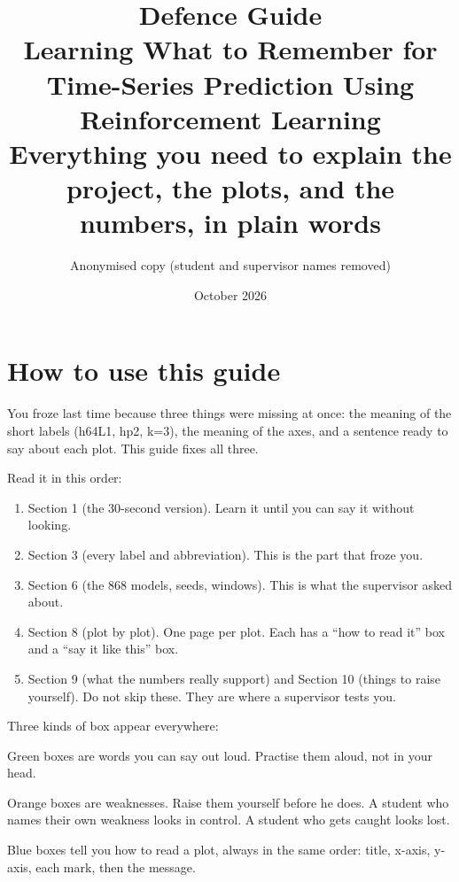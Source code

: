 \documentclass[11pt,a4paper]{article}
\title{\vspace{-1.5cm}\textbf{Defence Guide}\\[4pt]
\large Learning What to Remember for Time-Series Prediction Using Reinforcement Learning\\[2pt]
\normalsize Everything you need to explain the project, the plots, and the numbers, in plain words}
\author{Anonymised copy \quad (student and supervisor names removed)}
\date{October 2026}
\begin{document}
\maketitle
\vspace{-0.6cm}

\tableofcontents
\newpage

\section*{How to use this guide}

You froze last time because three things were missing at once: the meaning of the
short labels (h64L1, hp2, k=3), the meaning of the axes, and a sentence ready to say
about each plot. This guide fixes all three.

Read it in this order:
\begin{enumerate}
  \item Section 1 (the 30-second version). Learn it until you can say it without looking.
  \item Section 3 (every label and abbreviation). This is the part that froze you.
  \item Section 6 (the 868 models, seeds, windows). This is what the supervisor asked about.
  \item Section 8 (plot by plot). One page per plot. Each has a ``how to read it'' box
        and a ``say it like this'' box.
  \item Section 9 (what the numbers really support) and Section 10 (things to raise
        yourself). Do not skip these. They are where a supervisor tests you.
\end{enumerate}

Three kinds of box appear everywhere:
\begin{sayit}Green boxes are words you can say out loud. Practise them aloud, not in your head.\end{sayit}
\begin{honest}Orange boxes are weaknesses. Raise them yourself before he does. A student who
names their own weakness looks in control. A student who gets caught looks lost.\end{honest}
\begin{axes}Blue boxes tell you how to read a plot, always in the same order: title, x-axis,
y-axis, each mark, then the message.\end{axes}
\end{document}
